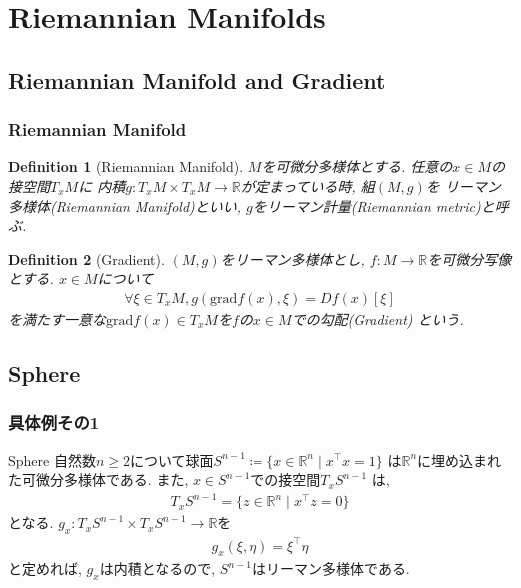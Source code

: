 \documentclass[dvipdfmx,11pt]{beamer}		%
\newtheorem{defi}{Definition}
\newcommand{\R}{\mathbb{R}}
\begin{document}
\section{Riemannian Manifolds}
    \subsection{Riemannian Manifold and Gradient}
    \begin{frame}
        \frametitle{Riemannian Manifold}
        \begin{defi}[Riemannian Manifold]
            $M$を可微分多様体とする. 任意の$x\in M$の接空間$T_{x}M$に
            内積$g : T_{x}M\times T_{x}M\to\R$が定まっている時, 組$(M, g)$を
            リーマン多様体(Riemannian Manifold)といい, $g$をリーマン計量(Riemannian metric)と呼ぶ. 
        \end{defi}
        \begin{defi}[Gradient]
            $(M, g)$をリーマン多様体とし, $f:M\to\R$を可微分写像とする. $x\in M$について
            \footnotesize
            \begin{align*}
                \forall\xi\in T_{x}M, g(\mathrm{grad} f(x), \xi) = Df(x)[\xi]
            \end{align*}
            \normalsize
            を満たす一意な$\mathrm{grad} f(x)\in T_{x}M$を$f$の$x\in M$での勾配(Gradient)
            という. 
        \end{defi}
    \end{frame}
    \subsection{Sphere}
    \begin{frame}
        \frametitle{具体例その1}
        \begin{exampleblock}{Sphere}
            自然数$n\geq2$について球面$S^{n - 1} \coloneqq\{x\in\R^n\mid x^{\top}x = 1\}$
            は$\R^n$に埋め込まれた可微分多様体である. また, $x\in S^{n - 1}$での接空間$T_{x}S^{n - 1}$
            は,
            \begin{align*}
                T_{x} S^{n - 1} = \{z\in\R^n\mid x^{\top}z = 0\}
            \end{align*}
            となる. $g_{x} : T_{x}S^{n - 1}\times T_{x}S^{n - 1}\to\R$を
            \begin{align*}
                g_{x}(\xi, \eta) = \xi^{\top}\eta
            \end{align*}
            と定めれば, $g_{x}$は内積となるので, $S^{n - 1}$はリーマン多様体である.
        \end{exampleblock}
    \end{frame}
\end{document}
